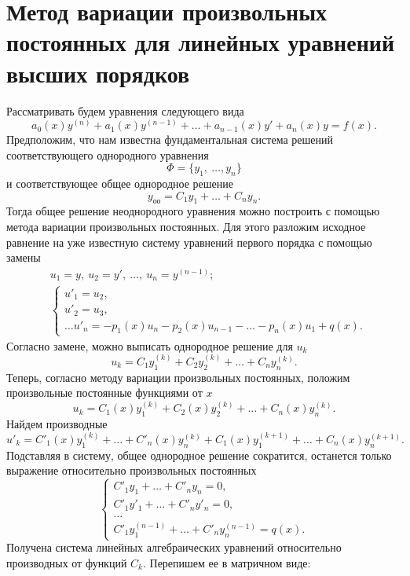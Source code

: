 \section{Метод вариации произвольных постоянных для линейных уравнений высших порядков}
    Рассматривать будем уравнения следующего вида
    \[
        a_0(x) y^{(n)} + a_1(x) y^{(n - 1)} + \dots + a_{n - 1}(x) y' + a_n(x) y = f(x).
    \]
    Предположим, что нам известна фундаментальная система решений соответствующего однородного уравнения
    \[
        \varPhi = \{ y_1, ~\dots, y_n \}
    \]
    и соответствующее общее однородное решение
    \[
        y_\text{оо} = C_1 y_1 + \dots + C_n y_n.
    \]
    Тогда общее решение неоднородного уравнения можно построить с помощью метода вариации произвольных постоянных. Для этого разложим исходное равнение на уже известную систему уравнений первого порядка с помощью замены
    \[
        \begin{split}
            &u_1 = y, ~ u_2 = y', ~ \dots, ~ u_n = y^{(n - 1)}; \\
            &\begin{cases}
                u'_1 = u_2, \\
                u'_2 = u_3, \\
                \dots
                u'_n = -p_1(x) u_n - p_2(x) u_{n - 1} - \dots - p_n(x) u_1 + q(x).
            \end{cases}
        \end{split}
    \]
    Согласно замене, можно выписать однородное решение для $ u_k $
    \[
        u_k = C_1 y^{(k)}_1 + C_2 y^{(k)}_2 + \dots + C_n y^{(k)}_n.
    \]
    Теперь, согласно методу вариации произвольных постоянных, положим произвольные постоянные функциями от $ x $
    \[
        u_k = C_1(x) y^{(k)}_1 + C_2(x) y^{(k)}_2 + \dots + C_n(x) y^{(k)}_n.
    \]
    Найдем производные
    \[
        u'_k = C'_1(x) y^{(k)}_1 + \dots + C'_n(x) y^{(k)}_n + C_1(x) y^{(k + 1)}_1 + \dots + C_n(x) y^{(k + 1)}_n.
    \]
    Подставляя в систему, общее однородное решение сократится, останется только выражение относительно произвольных постоянных
    \[
        \begin{cases}
            C'_1 y_1 + \dots + C'_n y_n = 0, \\
            C'_1 y'_1 + \dots + C'_n y'_n = 0, \\
            \dots \\
            C'_1 y^{(n - 1)}_1 + \dots + C'_n y^{(n - 1)}_n = q(x).
        \end{cases}
    \]
    Получена система линейных алгебраических уравнений относительно производных от функций $ C_k $. Перепишем ее в матричном виде:
